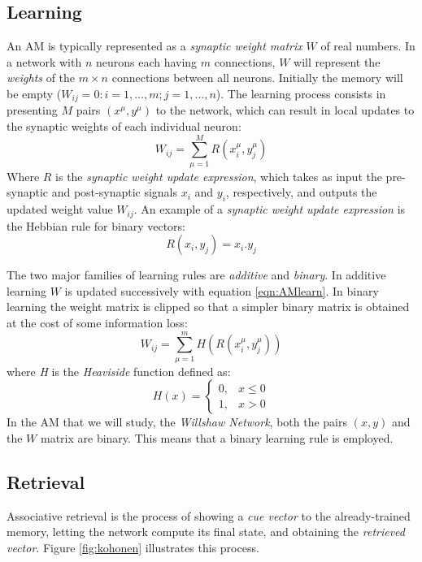 \documentclass[runningheads]{llncs}
\begin{document}
\subsection{Learning}
\label{sec:assomem_learn}
An AM is typically represented as a \textit{synaptic weight matrix} $W$ of real numbers. In a network with $n$ neurons each having $m$ connections, $W$ will represent the \textit{weights} of the  $m \times n$ connections between all neurons. Initially the memory will be empty ($W_{ij} = 0 : i=1, \ldots, m ;  j=1, \ldots, n  $). The learning process consists in presenting $M$ pairs $\left(x^{\mu}, y^{\mu}\right)$ to the network, which can result in local updates to the synaptic weights of each individual neuron:
\begin{equation}
\label{eqn:AMlearn}
    W_{ij}=\sum_{\mu=1}^{M} R \left( x_{i}^{\mu} , y_{j}^{\mu}\right)
\end{equation}
Where $R$ is the\textit{ synaptic weight update expression}, which takes as input the pre-synaptic and post-synaptic signals $x_i$ and $y_i$, respectively, and outputs the updated weight value $W_{ij}$. An example of a \textit{ synaptic weight update expression} is the Hebbian rule \cite{hebb2005organization} for binary vectors:
\begin{equation}
    R \left( x_i,y_j \right) = x_i . y_j
\end{equation}

The two major families of learning rules are \textit{additive} and \textit{binary}. In additive learning $W$ is updated successively with equation \ref{eqn:AMlearn}. In binary learning the weight matrix is clipped so that a simpler binary matrix is obtained at the cost of some information loss:
\begin{equation}
    W_{ij}=\sum_{\mu=1}^{m}H\left( R \left( x_{i}^{\mu}, y_{j}^{\mu}\right) \right)
\end{equation}
where \textit{H} is the \textit{Heaviside} function defined as:
\begin{equation}
    H(x)=\left\{\begin{array}{ll}
0, & x\leq 0 \\
1, & x > 0
\end{array}\right.
\label{eqn:heaviside}
\end{equation}
In the AM that we will study, the \textit{Willshaw Network}, both the pairs $(x,y)$ and the $W$ matrix are binary. This means that a binary learning rule is employed.

\subsection{Retrieval}
\label{sec:assomem_ret}
Associative retrieval is the process of showing a \textit{cue vector} to the already-trained memory, letting the network compute its final state, and obtaining the \textit{retrieved vector}. Figure \ref{fig:kohonen} illustrates this process. 
\end{document}
